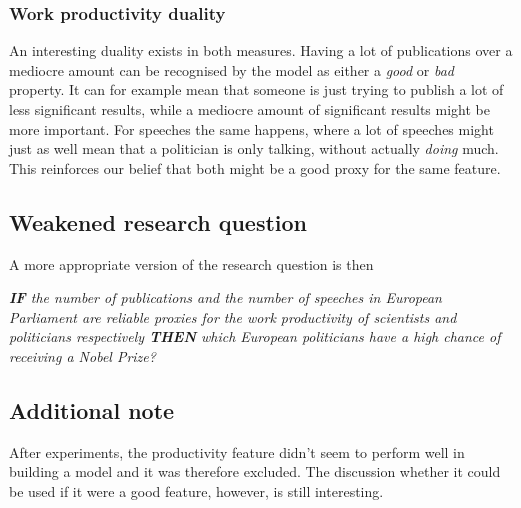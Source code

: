 \subsubsection{Work productivity duality}
An interesting duality exists in both measures. Having a lot of publications over a mediocre amount can be recognised by the model as either a \emph{good} or \emph{bad} property. It can for example mean that someone is just trying to publish a lot of less significant results, while a mediocre amount of significant results might be more important. For speeches the same happens, where a lot of speeches might just as well mean that a politician is only talking, without actually \emph{doing} much. This reinforces our belief that both might be a good proxy for the same feature.

\subsection{Weakened research question}
A more appropriate version of the research question is then
\begin{center}
	\emph{\textbf{\textsc{IF}} the number of publications and the number of speeches in European Parliament are reliable proxies for the work productivity of scientists and politicians respectively \textbf{\textsc{THEN}} which European politicians have a high chance of receiving a Nobel Prize?}
\end{center}

\subsection{Additional note}
After experiments, the productivity feature didn't seem to perform well in building a model and it was therefore excluded. The discussion whether it could be used if it were a good feature, however, is still interesting.

